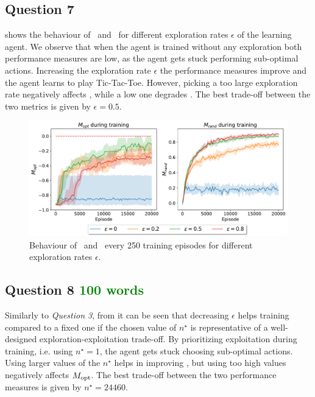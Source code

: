 \documentclass[10pt]{IEEEtran}
\begin{document}
\subsection*{Question 7}
 shows the behaviour of \mopt\ and \mrand\ for different exploration rates $\epsilon$ of the learning agent. We observe that when the agent is trained without any exploration both performance measures are low, as the agent gets stuck performing sub-optimal actions. Increasing the exploration rate $\epsilon$ the performance measures improve and the agent learns to play Tic-Tac-Toe. However, picking a too large exploration rate negatively affects \mopt, while a low one degrades \mrand. The best trade-off between the two metrics is given by $\epsilon = 0.5$.
\begin{figure}[h]
    \centering
    \includegraphics[width=\linewidth]{code/figures/performance_epsilon_self.pdf}
    \caption{Behaviour of \mopt\ and \mrand\ every 250 training episodes for different exploration rates $\epsilon$.}
    \label{plot_question7}
\end{figure}


\subsection*{Question 8  \textcolor{green}{100 words}}
Similarly to \emph{Question 3}, from  it can be seen that decreasing $\epsilon$ helps training compared to a fixed one if the chosen value of $n^{\star}$ is representative of a well-designed exploration-exploitation trade-off. By prioritizing exploitation during training, i.e. using $n^{\star} = 1$, the agent gets stuck choosing sub-optimal actions. Using larger values of the $n^{\star}$ helps in improving \mrand, but using too high values negatively affects $M_{\text{opt}}$. The best trade-off between the two performance measures is given by $n^{\star} = 24460$.  
\end{document}
